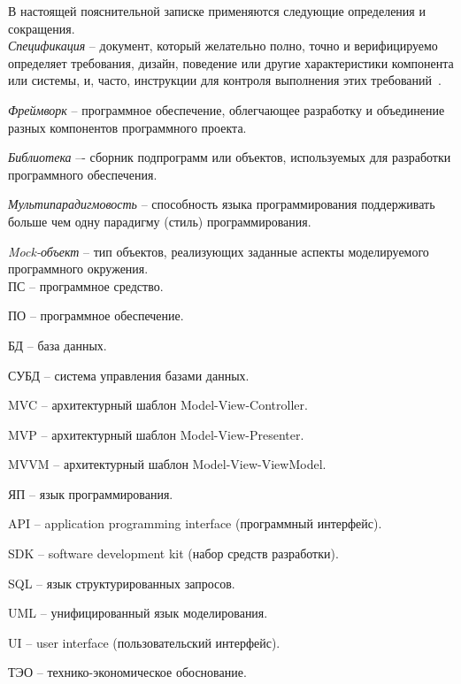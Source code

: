 \label{sec:definitions}

В настоящей пояснительной записке применяются следующие определения и сокращения.
\\

\emph{Спецификация} -- документ, который желательно полно, точно и верифицируемо определяет требования, дизайн, поведение или другие характеристики компонента или системы, и, часто, инструкции для контроля выполнения этих требований~\cite{istqb_specification}.


\emph{Фреймворк} -- программное обеспечение, облегчающее разработку и объединение разных компонентов программного проекта.

\emph{Библиотека} –- сборник подпрограмм или объектов, используемых для разработки программного обеспечения.

\emph{Мультипарадигмовость} -- способность языка программирования поддерживать больше чем одну парадигму (стиль) программирования.

\emph{Mock-объект} -- тип объектов, реализующих заданные аспекты моделируемого программного окружения.
\\

ПС -- программное средство.

ПО -- программное обеспечение.

БД -- база данных.

СУБД -- система управления базами данных.

MVC -- архитектурный шаблон Model-View-Controller.

MVP -- архитектурный шаблон Model-View-Presenter.

MVVM -- архитектурный шаблон Model-View-ViewModel.

ЯП -- язык программирования.

API -- application programming interface (программный интерфейс).

SDK -- software development kit (набор средств разработки).

SQL – язык структурированных запросов.

UML – унифицированный язык моделирования.

UI -- user interface (пользовательский интерфейс).

ТЭО -- технико-экономическое обоснование.
